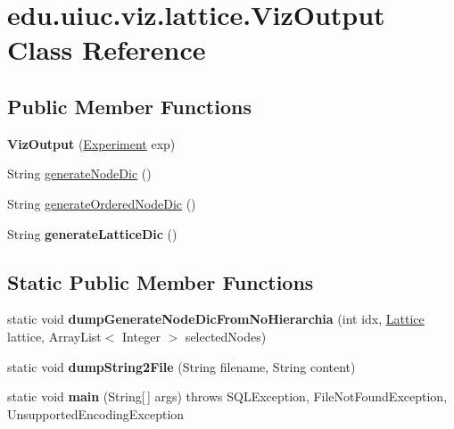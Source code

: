 \hypertarget{classedu_1_1uiuc_1_1viz_1_1lattice_1_1_viz_output}{}\section{edu.\+uiuc.\+viz.\+lattice.\+Viz\+Output Class Reference}
\label{classedu_1_1uiuc_1_1viz_1_1lattice_1_1_viz_output}
\subsection*{Public Member Functions}
\begin{DoxyCompactItemize}
\item 
\mbox{\label{classedu_1_1uiuc_1_1viz_1_1lattice_1_1_viz_output_a010fa2fe4ef4ce0e77a99056a79b7c4d}} 
{\bfseries Viz\+Output} (\mbox{\hyperlink{classedu_1_1uiuc_1_1viz_1_1algorithms_1_1_experiment}{Experiment}} exp)
\item 
String \mbox{\hyperlink{classedu_1_1uiuc_1_1viz_1_1lattice_1_1_viz_output_a90b2abe7b944e3e412f515829e23a79a}{generate\+Node\+Dic}} ()
\item 
String \mbox{\hyperlink{classedu_1_1uiuc_1_1viz_1_1lattice_1_1_viz_output_ad47008139c9bc6986968fa0d42c0d619}{generate\+Ordered\+Node\+Dic}} ()
\item 
\mbox{\label{classedu_1_1uiuc_1_1viz_1_1lattice_1_1_viz_output_a214a905a6ddbc689b9f2413b048e09fb}} 
String {\bfseries generate\+Lattice\+Dic} ()
\end{DoxyCompactItemize}
\subsection*{Static Public Member Functions}
\begin{DoxyCompactItemize}
\item 
\mbox{\label{classedu_1_1uiuc_1_1viz_1_1lattice_1_1_viz_output_a5bbb92bff7d20d7b90bce0e744550167}} 
static void {\bfseries dump\+Generate\+Node\+Dic\+From\+No\+Hierarchia} (int idx, \mbox{\hyperlink{classedu_1_1uiuc_1_1viz_1_1lattice_1_1_lattice}{Lattice}} lattice, Array\+List$<$ Integer $>$ selected\+Nodes)
\item 
\mbox{\label{classedu_1_1uiuc_1_1viz_1_1lattice_1_1_viz_output_aca987f1302f44567b1e34d16dc32081c}} 
static void {\bfseries dump\+String2\+File} (String filename, String content)
\item 
\mbox{\label{classedu_1_1uiuc_1_1viz_1_1lattice_1_1_viz_output_a2d4b1d337505ba5ac7e2332fe0309224}} 
static void {\bfseries main} (String\mbox{[}$\,$\mbox{]} args)  throws S\+Q\+L\+Exception, File\+Not\+Found\+Exception, Unsupported\+Encoding\+Exception  	
\end{DoxyCompactItemize}
